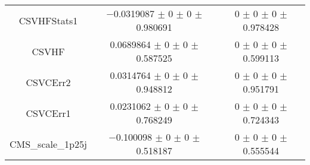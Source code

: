 \begin{table}
\begin{tabular}{ccc}
CSVHFStats1 & \num{-0.0319087} $\pm$ \num{0} $\pm$ \num{0} $\pm$ \num{0.980691} & \num{0} $\pm$ \num{0} $\pm$ \num{0} $\pm$ \num{0.978428}\\
CSVHF & \num{0.0689864} $\pm$ \num{0} $\pm$ \num{0} $\pm$ \num{0.587525} & \num{0} $\pm$ \num{0} $\pm$ \num{0} $\pm$ \num{0.599113}\\
CSVCErr2 & \num{0.0314764} $\pm$ \num{0} $\pm$ \num{0} $\pm$ \num{0.948812} & \num{0} $\pm$ \num{0} $\pm$ \num{0} $\pm$ \num{0.951791}\\
CSVCErr1 & \num{0.0231062} $\pm$ \num{0} $\pm$ \num{0} $\pm$ \num{0.768249} & \num{0} $\pm$ \num{0} $\pm$ \num{0} $\pm$ \num{0.724343}\\
CMS\_scale\_1p25j & \num{-0.100098} $\pm$ \num{0} $\pm$ \num{0} $\pm$ \num{0.518187} & \num{0} $\pm$ \num{0} $\pm$ \num{0} $\pm$ \num{0.555544}\\
\bottomrule
\end{tabular}
\end{table}
